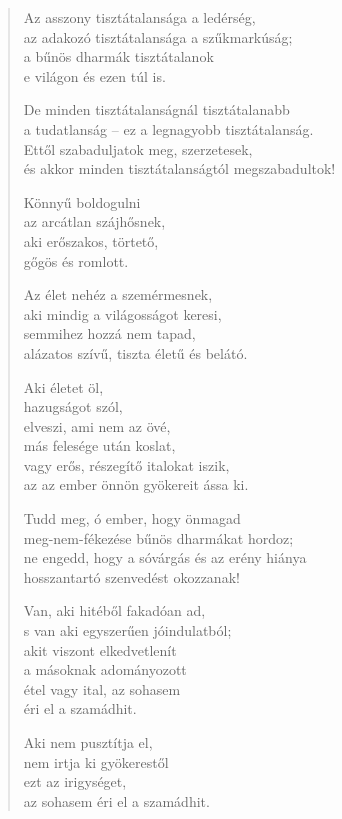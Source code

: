 \begin{verse}
 Az asszony tisztátalansága a ledérség,\\
az adakozó tisztátalansága a szűkmarkúság;\\
a bűnös dharmák tisztátalanok\\
e világon és ezen túl is.

 De minden tisztátalanságnál tisztátalanabb\\
a tudatlanság – ez a legnagyobb tisztátalanság.\\
Ettől szabaduljatok meg, szerzetesek,\\
és akkor minden tisztátalanságtól megszabadultok!

 Könnyű boldogulni\\
az arcátlan szájhősnek,\\
aki erőszakos, törtető,\\
gőgös és romlott.

 Az élet nehéz a szemérmesnek,\\
aki mindig a világosságot keresi,\\
semmihez hozzá nem tapad,\\
alázatos szívű, tiszta életű és belátó.

 Aki életet öl,\\
hazugságot szól,\\
elveszi, ami nem az övé,\\
más felesége után koslat,\\
vagy erős, részegítő italokat iszik,\\
az az ember önnön gyökereit ássa ki.

 Tudd meg, ó ember, hogy önmagad\\
meg-nem-fékezése bűnös dharmákat hordoz;\\
ne engedd, hogy a sóvárgás és az erény hiánya\\
hosszantartó szenvedést okozzanak!

 Van, aki hitéből fakadóan ad,\\
s van aki egyszerűen jóindulatból;\\
akit viszont elkedvetlenít\\
a másoknak adományozott\\
étel vagy ital, az sohasem\\
éri el a szamádhit.

 Aki nem pusztítja el,\\
nem irtja ki gyökerestől\\
ezt az irigységet,\\
az sohasem éri el a szamádhit.


\end{verse}

